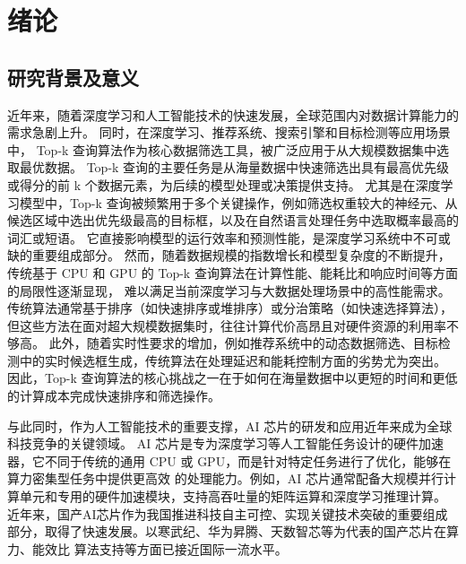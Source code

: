 \chapter{绪论}
\section{研究背景及意义}
近年来，随着深度学习和人工智能技术的快速发展，全球范围内对数据计算能力的需求急剧上升\cite{devlin2019bert}\cite{vaswani2017attention}。
同时，在深度学习\cite{vaswani2017attention}、推荐系统、搜索引擎\cite{wangningmapreduce}和目标检测\cite{krizhevsky2012imagenet}等应用场景中，
Top-k 查询算法作为核心数据筛选工具，被广泛应用于从大规模数据集中选取最优数据\cite{韩希先2010tkep}\cite{JSJA202405009}。
Top-k 查询的主要任务是从海量数据中快速筛选出具有最高优先级或得分的前 k 个数据元素，为后续的模型处理或决策提供支持。
尤其是在深度学习模型中，Top-k 查询被频繁用于多个关键操作，例如筛选权重较大的神经元、从候选区域中选出优先级最高的目标框，以及在自然语言处理任务中选取概率最高的词汇或短语。
它直接影响模型的运行效率和预测性能，是深度学习系统中不可或缺的重要组成部分。\cite{zeng2024turn}
然而，随着数据规模的指数增长和模型复杂度的不断提升，传统基于 CPU 和 GPU 的 Top-k 查询算法在计算性能、能耗比和响应时间等方面的局限性逐渐显现，
难以满足当前深度学习与大数据处理场景中的高性能需求\cite{sgherzi2022mixed}。
传统算法通常基于排序（如快速排序或堆排序）或分治策略（如快速选择算法），但这些方法在面对超大规模数据集时，往往计算代价高昂且对硬件资源的利用率不够高。
此外，随着实时性要求的增加，例如推荐系统中的动态数据筛选、目标检测中的实时候选框生成，传统算法在处理延迟和能耗控制方面的劣势尤为突出。
因此，Top-k 查询算法的核心挑战之一在于如何在海量数据中以更短的时间和更低的计算成本完成快速排序和筛选操作。

与此同时，作为人工智能技术的重要支撑，AI 芯片的研发和应用近年来成为全球科技竞争的关键领域。
AI 芯片是专为深度学习等人工智能任务设计的硬件加速器，它不同于传统的通用 CPU 或 GPU，而是针对特定任务进行了优化，能够在算力密集型任务中提供更高效
的处理能力。例如，AI 芯片通常配备大规模并行计算单元和专用的硬件加速模块，支持高吞吐量的矩阵运算和深度学习推理计算。
近年来，国产AI芯片作为我国推进科技自主可控、实现关键技术突破的重要组成部分，取得了快速发展。以寒武纪、华为昇腾、天数智芯等为代表的国产芯片在算力、能效比
算法支持等方面已接近国际一流水平\cite{ZWQY201725011}\cite{GCKX202501012}。

